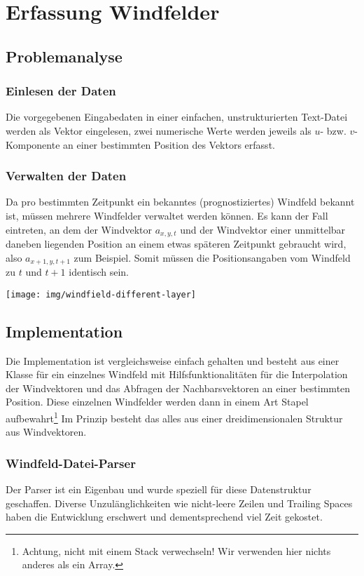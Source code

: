 
\section{Erfassung Windfelder}\label{s:windfields}

\subsection{Problemanalyse}
\subsubsection{Einlesen der Daten}
Die vorgegebenen Eingabedaten in einer einfachen, unstrukturierten
Text-Datei werden als Vektor eingelesen, zwei numerische Werte werden
jeweils als $u$- bzw. $v$-Komponente an einer bestimmten Position des
Vektors erfasst.

\subsubsection{Verwalten der Daten}
Da pro bestimmten Zeitpunkt ein bekanntes (prognostiziertes) Windfeld
bekannt ist, müssen mehrere Windfelder verwaltet werden können. Es kann
der Fall eintreten, an dem der Windvektor $a_{x,y,t}$ und der Windvektor
einer unmittelbar daneben liegenden Position an einem etwas späteren
Zeitpunkt gebraucht wird, also $a_{x+1,y,t+1}$ zum Beispiel. Somit
müssen die Positionsangaben vom Windfeld zu $t$ und $t+1$ identisch
sein. 

\texttt{[image: img/windfield-different-layer]}

\subsection{Implementation}
Die Implementation ist vergleichsweise einfach gehalten und besteht aus
einer Klasse für ein einzelnes Windfeld mit Hilfsfunktionalitäten für
die Interpolation der Windvektoren und das Abfragen der Nachbarsvektoren
an einer bestimmten Position. Diese einzelnen Windfelder werden dann in
einem Art Stapel aufbewahrt\footnote{Achtung, nicht mit einem Stack
verwechseln! Wir verwenden hier nichts anderes als ein Array.} Im
Prinzip besteht das alles aus einer dreidimensionalen Struktur aus
Windvektoren.

\subsubsection{Windfeld-Datei-Parser}
Der Parser ist ein Eigenbau und wurde speziell für diese Datenstruktur
geschaffen. Diverse Unzulänglichkeiten wie nicht-leere Zeilen und
Trailing Spaces haben die Entwicklung erschwert und dementsprechend viel
Zeit gekostet.

